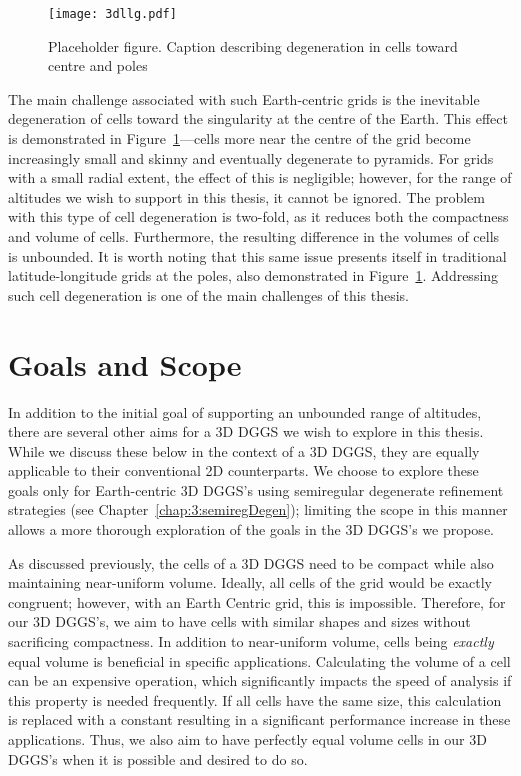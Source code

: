 \begin{figure}[h]
	\centering
	\texttt{[image: 3dllg.pdf]}
	\caption[Different Views of a 3D Latitude-Longitude Grid]{
		Placeholder figure.
		Caption describing degeneration in cells toward centre and poles
	}
	\label{fig:3dllg}
\end{figure}


The main challenge associated with such Earth-centric grids is the inevitable degeneration of cells toward the singularity at the centre of the Earth.
This effect is demonstrated in Figure~\ref{fig:3dllg}---cells more near the centre of the grid become increasingly small and skinny and eventually degenerate to pyramids.
For grids with a small radial extent, the effect of this is negligible; however, for the range of altitudes we wish to support in this thesis, it cannot be ignored.
The problem with this type of cell degeneration is two-fold, as it reduces both the compactness and volume of cells.
Furthermore, the resulting difference in the volumes of cells is unbounded.
It is worth noting that this same issue presents itself in traditional latitude-longitude grids at the poles, also demonstrated in Figure~\ref{fig:3dllg}.
Addressing such cell degeneration is one of the main challenges of this thesis.


\section{Goals and Scope} \label{chap:1:goals}
In addition to the initial goal of supporting an unbounded range of altitudes, there are several other aims for a 3D DGGS we wish to explore in this thesis.
While we discuss these below in the context of a 3D DGGS, they are equally applicable to their conventional 2D counterparts.
We choose to explore these goals only for Earth-centric 3D DGGS's using semiregular degenerate refinement strategies (see Chapter~\ref{chap:3:semiregDegen}); limiting the scope in this manner allows a more thorough exploration of the goals in the 3D DGGS's we propose.


As discussed previously, the cells of a 3D DGGS need to be compact while also maintaining near-uniform volume.
Ideally, all cells of the grid would be exactly congruent; however, with an Earth Centric grid, this is impossible.
Therefore, for our 3D DGGS's, we aim to have cells with similar shapes and sizes without sacrificing compactness.
In addition to near-uniform volume, cells being \textit{exactly} equal volume is beneficial in specific applications.
Calculating the volume of a cell can be an expensive operation, which significantly impacts the speed of analysis if this property is needed frequently.
If all cells have the same size, this calculation is replaced with a constant resulting in a significant performance increase in these applications.
Thus, we also aim to have perfectly equal volume cells in our 3D DGGS's when it is possible and desired to do so.


